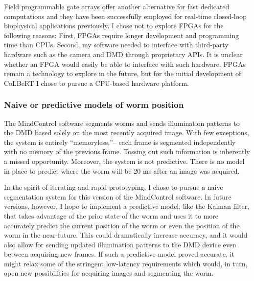 Field programmable gate arrays offer another alternative for fast dedicated computations and they have been successfully employed for real-time closed-loop biophysical applications  previously\citep{fields_electrokinetic_2011}. I chose not to explore FPGAs for the following reasons: First, FPGAs require longer development and programming time than CPUs.  Second, my software needed to interface with third-party hardware such as the camera and DMD through proprietary APIs. It is unclear whether an FPGA would easily be able to interface with such hardware. FPGAs remain a technology to explore in the future, but for the initial development of CoLBeRT I chose to pursue a CPU-based hardware platform.   

\subsubsection{Naive or predictive models of worm position}
The MindControl software segments  worms and sends illumination patterns to the DMD based solely on the most recently acquired image. With few exceptions, the system is entirely ``memoryless,''-- each frame is segmented independently with no memory of the previous frame. Tossing out such information is inherently a missed opportunity. Moreover, the system is not predictive. There is no model in place to predict where the worm will be 20 ms after an image was acquired.  

In the spirit of iterating and rapid prototyping, I chose to pursue a naive segmentation system for this version of the MindControl software. In future versions, however, I hope to implement a predictive model, like the Kalman filter, that takes advantage of the prior state of the worm and uses it to more accurately predict the current position of the worm or even the position of the worm in the near-future. This could dramatically increase accuracy, and it would also allow for sending updated illumination patterns to the DMD device even between acquiring new frames. If such a predictive model proved accurate, it might relax some of the stringent low-latency requirements which would, in turn, open new possibilities for acquiring images and segmenting the worm.




